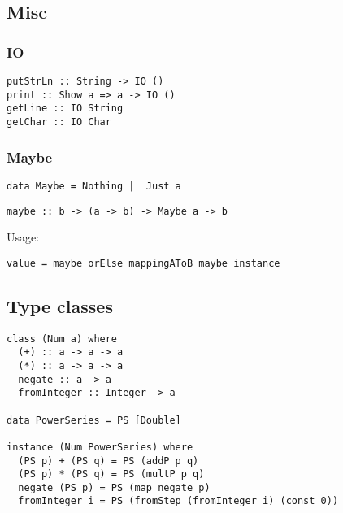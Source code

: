 \subsection{Misc}
\subsubsection{IO}
\begin{verbatim}
putStrLn :: String -> IO ()
print :: Show a => a -> IO ()
getLine :: IO String
getChar :: IO Char
\end{verbatim}
\subsubsection{Maybe}
\begin{verbatim}
data Maybe = Nothing |  Just a
\end{verbatim}
\begin{verbatim}
maybe :: b -> (a -> b) -> Maybe a -> b
\end{verbatim}
Usage:
\begin{verbatim}
value = maybe orElse mappingAToB maybe instance
\end{verbatim}
\subsection{Type classes}
\begin{verbatim}
class (Num a) where
  (+) :: a -> a -> a
  (*) :: a -> a -> a
  negate :: a -> a
  fromInteger :: Integer -> a

data PowerSeries = PS [Double]

instance (Num PowerSeries) where
  (PS p) + (PS q) = PS (addP p q)
  (PS p) * (PS q) = PS (multP p q)
  negate (PS p) = PS (map negate p)
  fromInteger i = PS (fromStep (fromInteger i) (const 0))
\end{verbatim}

